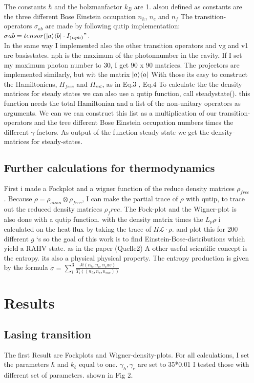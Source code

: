 \documentclass[12pt,a4paper]{article}
\DeclarePairedDelimiter\bra{\langle}{\rvert}
\DeclarePairedDelimiter\ket{\lvert}{\rangle}
\begin{document}
The constants $\hbar $ and the bolzmanfactor $k_B$ are 1.
alsou defined as constants are the three different Bose Einstein occupation $n_h$, $n_c$ and $n_f$
The transition-operators $\sigma_{ab}$ are  made by following qutip implementation:\\ $\sigma_{}ab=tensor(\ket{a}\bra{b}\cdot I_{(nph)}"$.\\
In the same way I implemented also the other transition operators and 
vg and v1 are basisstates.  nph is the maximum of the photonnumber in the cavity. If I set my maximum photon number to 30, I get 90 x 90 matrices. 
The projectors are implemented similarly, but wit the matrix $\ket{a}\bra{a}$
With those its easy to construct the Hamiltoniens, $H_{free}$ and $H_{int}$, as in Eq.3 , Eq.4
To calculate the the density matrices for steady states we can also use a qutip function, call steadystate().
this function needs the total Hamiltonian and a list of the non-unitary operators as arguments.
We can we can construct this list as a multiplication of our transition-operators and the tree different Bose Einstein occupation numbers times the different $\gamma$-factors. 
As output of the function steady state we get the density-matrices for steady-states.
\subsection{Further calculations for thermodynamics}
First i made a Fockplot and a wigner function of the reduce density matrices $\rho_{free}$.
Because $\rho=\rho_{atom}\otimes \rho_{free}$, I can make the partial trace of $\rho$ with qutip, to trace out the reduced density matrices $\rho_free$. The Fock-plot and the Wigner-plot is also done with a qutip function.
with the density matrix times the $L_{p}\rho$ i calculated on the heat flux by taking the trace of $H \mathcal{L}\cdot \rho$. 
and plot this for 200 different  $g$ `s 
so the goal of this work is to find Einstein-Bose-distributions which yield a RAHV state.
as in the paper (Quelle2) 
A other useful scientific concept is the entropy. its also a physical physical property. 
The entropy production is given by the formula $\dot{\sigma}=\sum_i ^3 \frac{Ji(n_h,n_c,n_cav)}{T_i((n_h,n_c,n_{cav}))}$



\section{Results}
\subsection{Lasing transition}
The first Result are Fockplots and Wigner-density-plots.
For all calculations, I set the parameters  $\hbar$ and $k_b$ equal to one. $\gamma_h, \gamma_c $ are set to 35*0.01
I tested those with different set of parameters. 
shown in Fig 2.\\
\end{document}
